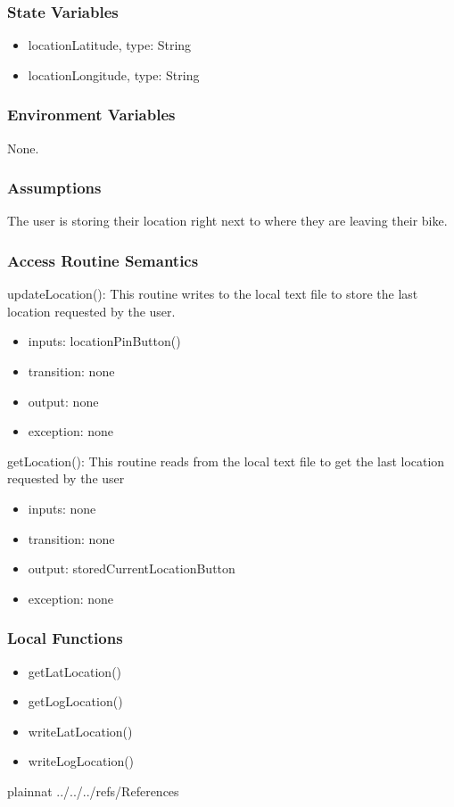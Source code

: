 \documentclass[12pt, titlepage]{article}
\begin{document}
\subsubsection{State Variables}

\begin{itemize}
\item locationLatitude, type: String
\item locationLongitude, type: String
\end{itemize}


\subsubsection{Environment Variables}

None.


\subsubsection{Assumptions}

The user is storing their location right next to where they are leaving their bike. 

\subsubsection{Access Routine Semantics}

\noindent updateLocation():
This routine writes to the local text file to store the last location requested by the user.
\begin{itemize}
\item inputs: locationPinButton()
\item transition: none
\item output: none
\item exception: none
\end{itemize}

\noindent getLocation():
This routine reads from the local text file to get the last location requested by the user
\begin{itemize}
\item inputs: none
\item transition: none
\item output: storedCurrentLocationButton
\item exception: none
\end{itemize}

\subsubsection{Local Functions}

\begin{itemize}
\item getLatLocation()
\item getLogLocation()
\item writeLatLocation()
\item writeLogLocation()
\end{itemize}

\newpage

 {plainnat}
 {../../../refs/References}



\end{document}
